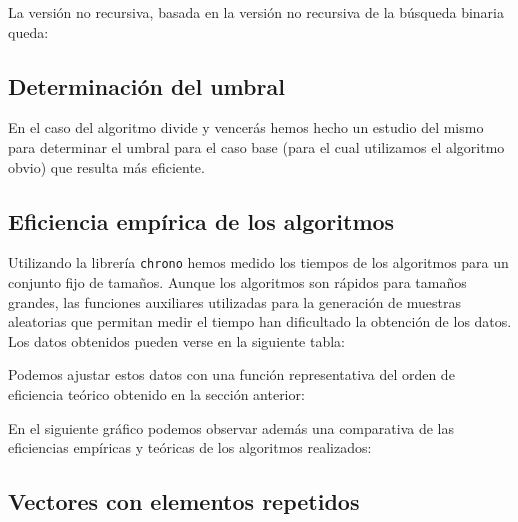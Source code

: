 La versión no recursiva, basada en la versión no recursiva de la búsqueda binaria queda:




\subsection{Determinación del umbral}

En el caso del algoritmo divide y vencerás hemos hecho un estudio del mismo para determinar el umbral para el caso base (para el cual utilizamos el algoritmo obvio) que resulta más eficiente.


\subsection{Eficiencia empírica de los algoritmos}

Utilizando la librería \texttt{chrono} hemos medido los tiempos de los algoritmos para un conjunto fijo de tamaños. Aunque los algoritmos son rápidos para tamaños grandes, las funciones auxiliares utilizadas para la generación de muestras aleatorias que permitan medir el tiempo han dificultado la obtención de los datos. Los datos obtenidos pueden verse en la siguiente tabla:


Podemos ajustar estos datos con una función representativa del orden de eficiencia teórico obtenido en la sección anterior:


En el siguiente gráfico podemos observar además una comparativa de las eficiencias empíricas y teóricas de los algoritmos realizados:


\subsection{Vectores con elementos repetidos}
